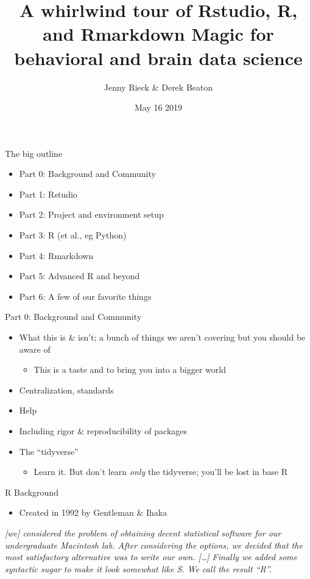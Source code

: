 \documentclass[
  ignorenonframetext,
]{beamer}
\title{A whirlwind tour of Rstudio, R, and Rmarkdown Magic for behavioral and
brain data science}
\author{Jenny Rieck \& Derek Beaton}
\date{May 16 2019}
\institute{Rotman Research Institute, Baycrest Health Sciences}
\providecommand{\tightlist}{%
  \setlength{\itemsep}{0pt}\setlength{\parskip}{0pt}}
\begin{document}
\frame{\titlepage}

\begin{frame}{The big outline}
\protect\hypertarget{the-big-outline}{}

\begin{itemize}[<+->]
\tightlist
\item
  Part 0: Background and Community
\item
  Part 1: Rstudio
\item
  Part 2: Project and environment setup
\item
  Part 3: R (et al., eg Python)
\item
  Part 4: Rmarkdown
\item
  Part 5: Advanced R and beyond
\item
  Part 6: A few of our favorite things
\end{itemize}

\end{frame}

\begin{frame}{Part 0: Background and Community}
\protect\hypertarget{part-0-background-and-community}{}

\begin{itemize}[<+->]
\tightlist
\item
  What this is \& isn't; a bunch of things we aren't covering but you
  should be aware of

  \begin{itemize}[<+->]
  \tightlist
  \item
    This is a taste and to bring you into a bigger world
  \end{itemize}
\item
  Centralization, standards
\item
  Help
\item
  Including rigor \& reproducibility of packages
\item
  The ``tidyverse''

  \begin{itemize}[<+->]
  \tightlist
  \item
    Learn it. But don't learn \emph{only} the tidyverse; you'll be lost
    in base R
  \end{itemize}
\end{itemize}

\end{frame}

\begin{frame}{R Background}
\protect\hypertarget{r-background}{}

\begin{itemize}[<+->]
\tightlist
\item
  Created in 1992 by Gentleman \& Ihaka
\end{itemize}

\emph{{[}we{]} considered the problem of obtaining decent statistical
software for our undergraduate Macintosh lab. After considering the
options, we decided that the most satisfactory alternative was to write
our own. {[}\ldots{}{]} Finally we added some syntactic sugar to make it
look somewhat like S. We call the result ``R''.}

\end{frame}
\end{document}
